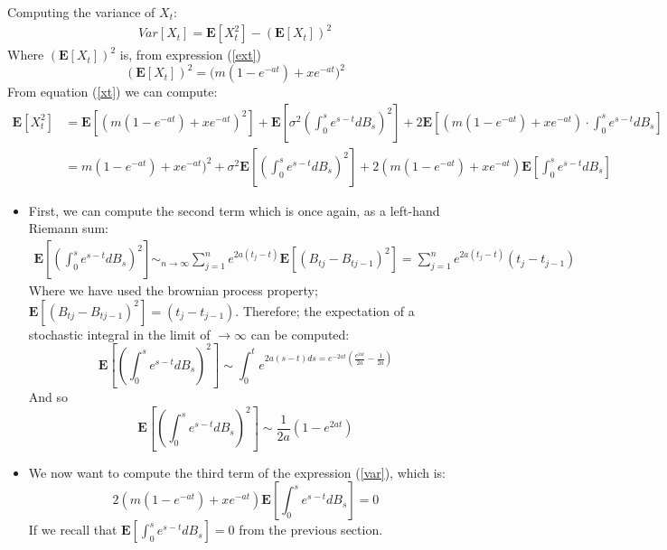 \documentclass[12pt]{article}
\begin{document}
Computing the variance of $X_t$:
\begin{align}\label{final}
Var[X_t] = \mathbf{E}[X_t^2]-(\mathbf{E}[X_t])^2
\end{align}
Where $(\mathbf{E}[X_t])^2$ is, from expression (\ref{ext})
\begin{equation}
(\mathbf{E}[X_t])^2 = \bigg(m(1-e^{-at}) + x e^{-at} \bigg)^2
\end{equation} 
From equation (\ref{xt}) we can compute:
\begin{align}\label{var}
\mathbf{E}[X_t^2] &= \mathbf{E}[(m(1-e^{-at}) + x e^{-at} )^2]+ \mathbf{E}\left[ \sigma^2 (\int_0^s e^{s-t}dB_s)^2 \right] + 2\mathbf{E}\left[(m(1-e^{-at}) + x e^{-at})\cdot \int_0^s e^{s-t}dB_s\right] \\
&= m(1-e^{-at}) + x e^{-at} )^2+ \sigma^2 \mathbf{E}\left[ (\int_0^s e^{s-t}dB_s)^2 \right] + 2(m(1-e^{-at}) + x e^{-at})\mathbf{E}\left[ \int_0^s e^{s-t}dB_s\right]
\end{align}
\begin{itemize}
\item {First, we can compute the second term which is once again, as a left-hand Riemann sum:}
\begin{align}
\mathbf{E}\left[\left(\int_0^s e^{s-t}dB_s\right)^2\right] \sim_{n\longrightarrow \infty} \sum_{j=1}^n e^{2a(t_j-t)} \mathbf{E}[(B_{tj}-B_{tj-1})^2] =  \sum_{j=1}^n e^{2a(t_j-t)} (t_j-t_{j-1})
\end{align}
Where we have used the brownian process property; $\mathbf{E}[(B_{tj}-B_{tj-1})^2] = (t_j-t_{j-1})$. Therefore;  the expectation of a stochastic integral  in the limit of $\longrightarrow \infty$ can be computed:
\begin{equation}
\mathbf{E}\left[\left(\int_0^s e^{s-t}dB_s\right)^2\right] \sim  \int_0^t e^{2a(s-t)ds =  e^{-2at}\left(\frac{e^{2at}}{2a}-\frac{1}{2a}\right)} 
\end{equation}
And so
\begin{equation}
\mathbf{E}\left[\left(\int_0^s e^{s-t}dB_s\right)^2\right]  \sim \frac{1}{2a} (1-e^{2at})
\end{equation}

\item {We now want to compute the third term of the expression (\ref{var}), which is:}
\begin{equation}
2(m(1-e^{-at}) + x e^{-at})\mathbf{E}\left[ \int_0^s e^{s-t}dB_s\right]  = 0
\end{equation}
If we recall that $\mathbf{E}[ \int_0^s e^{s-t}dB_s]  = 0$ from the previous section.
\end{itemize}
\end{document}

